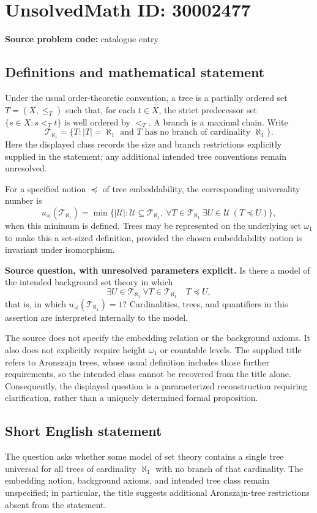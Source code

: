 \documentclass[11pt]{article}
\begin{document}
\section*{UnsolvedMath ID: 30002477}
\textbf{Source problem code:} catalogue entry
\subsection{Definitions and mathematical statement}
Under the usual order-theoretic convention, a tree is a partially ordered set \(T=(X,\leq_T)\) such that, for each \(t\in X\), the strict predecessor set \(\{s\in X:s<_T t\}\) is well ordered by \(<_T\). A branch is a maximal chain. Write
\[
\mathcal T_{\aleph_1}=\{T:|T|=\aleph_1\text{ and }T\text{ has no branch of cardinality }\aleph_1\}.
\]
Here the displayed class records the size and branch restrictions explicitly supplied in the statement; any additional intended tree conventions remain unresolved.

For a specified notion \(\preccurlyeq\) of tree embeddability, the corresponding universality number is
\[
u_{\preccurlyeq}(\mathcal T_{\aleph_1})=
\min\bigl\{|\mathcal U|:\mathcal U\subseteq\mathcal T_{\aleph_1},\ 
\forall T\in\mathcal T_{\aleph_1}\ \exists U\in\mathcal U\ (T\preccurlyeq U)\bigr\},
\]
when this minimum is defined. Trees may be represented on the underlying set \(\omega_1\) to make this a set-sized definition, provided the chosen embeddability notion is invariant under isomorphism.

\textbf{Source question, with unresolved parameters explicit.} Is there a model of the intended background set theory in which
\[
\exists U\in\mathcal T_{\aleph_1}\ \forall T\in\mathcal T_{\aleph_1}\quad T\preccurlyeq U,
\]
that is, in which \(u_{\preccurlyeq}(\mathcal T_{\aleph_1})=1\)? Cardinalities, trees, and quantifiers in this assertion are interpreted internally to the model.

The source does not specify the embedding relation or the background axioms. It also does not explicitly require height \(\omega_1\) or countable levels. The supplied title refers to Aronszajn trees, whose usual definition includes those further requirements, so the intended class cannot be recovered from the title alone. Consequently, the displayed question is a parameterized reconstruction requiring clarification, rather than a uniquely determined formal proposition.
\subsection{Short English statement}
The question asks whether some model of set theory contains a single tree universal for all trees of cardinality \(\aleph_1\) with no branch of that cardinality. The embedding notion, background axioms, and intended tree class remain unspecified; in particular, the title suggests additional Aronszajn-tree restrictions absent from the statement.
\end{document}
